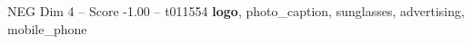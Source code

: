 \begin{textsample}{NEG Dim 4 – Score -1.00 – t011554}  \label{ex:f4_neg_019}
\textbf{logo}, photo\_caption, sunglasses, advertising, mobile\_phone

\end{textsample}
